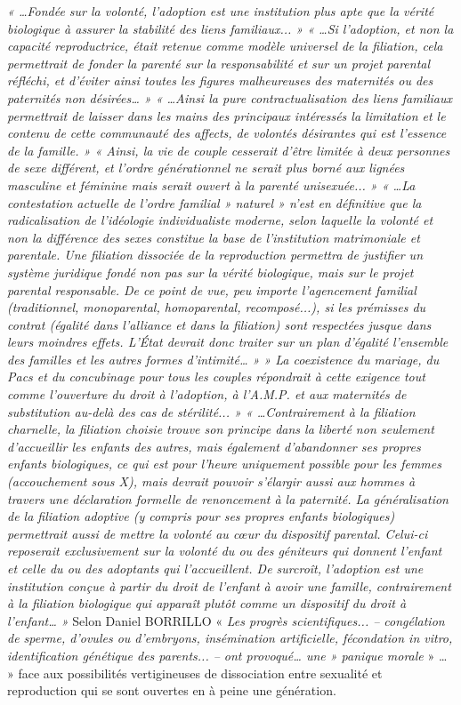  \emph{« …Fondée sur la volonté, l'adoption est une institution plus apte que la vérité biologique à assurer la stabilité des liens familiaux... » 
 « …Si l'adoption, et non la capacité reproductrice, était retenue comme modèle universel de la filiation, cela permettrait de fonder la parenté sur la responsabilité et sur un projet parental réfléchi, et d'éviter ainsi toutes les figures malheureuses des maternités ou des paternités non désirées… » 
 « …Ainsi la pure contractualisation des liens familiaux permettrait de laisser dans les mains des principaux intéressés la limitation et le contenu de cette communauté des affects, de volontés désirantes qui est l'essence de la famille. » 
 « Ainsi, la vie de couple cesserait d'être limitée à deux personnes de sexe différent, et l'ordre générationnel ne serait plus borné aux lignées masculine et féminine mais serait ouvert à la parenté unisexuée... »
 « …La contestation actuelle de l'ordre familial » naturel » n'est en définitive que la radicalisation de l'idéologie individualiste moderne, selon laquelle la volonté et non la différence des sexes constitue la base de l'institution matrimoniale et parentale. Une filiation dissociée de la reproduction permettra de justifier un système juridique fondé non pas sur la vérité biologique, mais sur le projet parental responsable. De ce point de vue, peu importe l'agencement familial (traditionnel, monoparental, homoparental, recomposé...), si les prémisses du contrat (égalité dans l'alliance et dans la filiation) sont respectées jusque dans leurs moindres effets. L'État devrait donc traiter sur un plan d'égalité l'ensemble des familles et les autres formes d'intimité… »
 » La coexistence du mariage, du Pacs et du concubinage pour tous les couples répondrait à cette exigence tout comme l'ouverture du droit à l'adoption, à l'A.M.P. et aux maternités de substitution au-delà des cas de stérilité... » 
 « …Contrairement à la filiation charnelle, la filiation choisie trouve son principe dans la liberté non seulement d'accueillir les enfants des autres, mais également d'abandonner ses propres enfants biologiques, ce qui est pour l'heure uniquement possible pour les femmes (accouchement sous X), mais devrait pouvoir s'élargir aussi aux hommes à travers une déclaration formelle de renoncement à la paternité. La généralisation de la filiation adoptive (y compris pour ses propres enfants biologiques) permettrait aussi de mettre la volonté au cœur du dispositif parental. Celui-ci reposerait exclusivement sur la volonté du ou des géniteurs qui donnent l'enfant et celle du ou des adoptants qui l'accueillent. De surcroît, l'adoption est une institution conçue à partir du droit de l'enfant à avoir une famille, contrairement à la filiation biologique qui apparaît plutôt comme un dispositif du droit à l'enfant… »
}Selon Daniel BORRILLO « \emph{Les progrès scientifiques... – congélation de sperme, d'ovules ou d'embryons, insémination artificielle, fécondation in vitro, identification génétique des parents... – ont provoqué… une » panique morale} » … » face aux possibilités vertigineuses de dissociation entre sexualité et reproduction qui se sont ouvertes en à peine une génération. 
